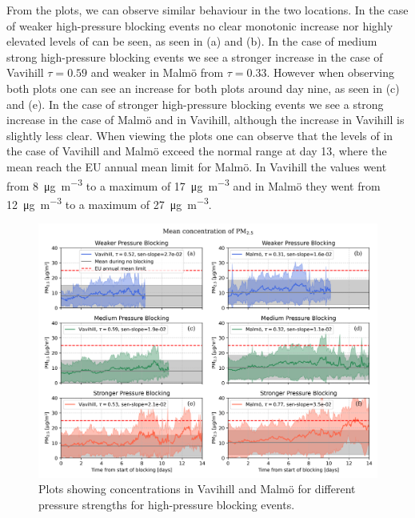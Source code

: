 From the plots, we can observe similar behaviour in the two locations. In the case of weaker high-pressure blocking events no clear monotonic increase nor highly elevated levels of \PM can be seen, as seen in (a) and (b). In the case of medium strong high-pressure blocking events we see a stronger increase in the case of Vavihill $\tau=0.59$ and weaker in Malmö from $\tau=0.33$. However when observing both plots one can see an increase for both plots around day nine, as seen in (c) and (e). In the case of stronger high-pressure blocking events we see a strong increase in the case of Malmö and in Vavihill, although the increase in Vavihill is slightly less clear. When viewing the plots one can observe that the levels of \PM in the case of Vavihill and Malmö exceed the normal range at day 13, where the mean reach the EU annual mean limit for Malmö. In Vavihill the values went from \SI{8}{\micro\gram\per\meter\cubed} to a maximum of \SI{17}{\micro\gram\per\meter\cubed} and in Malmö they went from \SI{12}{\micro\gram\per\meter\cubed} to a maximum of \SI{27}{\micro\gram\per\meter\cubed}. 


\begin{figure}[H]
        \centering
        \includegraphics[width=\textwidth]{Figures/Meanplot_pressure.png}
        \caption{Plots showing \PM concentrations in Vavihill and Malmö for different pressure strengths for high-pressure blocking events.}
        \label{fig:Meanplot_pressure}
\end{figure}

 

